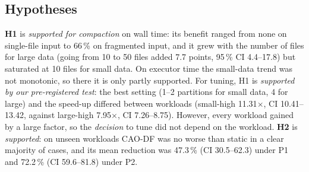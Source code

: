 \subsection{Hypotheses}
\textbf{H1} is \emph{supported for compaction} on wall time: its benefit ranged from none on
single-file input to 66\,\% on fragmented input, and it grew with the number of files for
large data (going from 10 to 50 files added 7.7 points, 95\,\% CI 4.4--17.8) but saturated at 10 files for
small data. On executor time the small-data trend was not monotonic, so there it is only
partly supported. For tuning, H1 is \emph{supported by our pre-registered test}: the best
setting (1--2 partitions for small data, 4 for large) and the speed-up differed between
workloads (small-high 11.31$\times$, CI 10.41--13.42, against large-high 7.95$\times$, CI
7.26--8.75). However, every workload gained by a large factor, so the \emph{decision} to tune
did not depend on the workload. \textbf{H2} is \emph{supported}: on unseen workloads CAO-DF
was no worse than static in a clear majority of cases, and its mean reduction was 47.3\,\%
(CI 30.5--62.3) under P1 and 72.2\,\% (CI 59.6--81.8) under P2.
